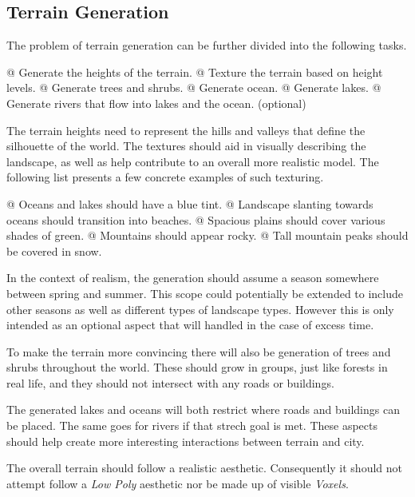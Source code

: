 \subsection{Terrain Generation}

The problem of terrain generation can be further divided into the following tasks.
\begin{easylist}
  @ Generate the heights of the terrain.
  @ Texture the terrain based on height levels.
  @ Generate trees and shrubs.
  @ Generate ocean.
  @ Generate lakes.
  @ Generate rivers that flow into lakes and the ocean. (optional)
\end{easylist}

The terrain heights need to represent the hills and valleys that define the silhouette of the world.
The textures should aid in visually describing the landscape, as well as
help contribute to an overall more realistic model. The following list presents
a few concrete examples of such texturing.
\begin{easylist}
  @ Oceans and lakes should have a blue tint.
  @ Landscape slanting towards oceans should transition into beaches.
  @ Spacious plains should cover various shades of green.
  @ Mountains should appear rocky.
  @ Tall mountain peaks should be covered in snow.
\end{easylist}

In the context of realism, the generation should assume a season somewhere
between spring and summer.
This scope could potentially be extended to include other seasons as well as
different types of landscape types.
However this is only intended as an optional aspect that will handled in the case
of excess time.

To make the terrain more convincing there will also be generation of trees and shrubs
throughout the world. These should grow in groups, just like forests in
real life, and they should not intersect with any roads or buildings.

The generated lakes and oceans will both restrict where roads and buildings can be placed.
The same goes for rivers if that strech goal is met.
These aspects should help create more interesting interactions between terrain and city.

The overall terrain should follow a realistic aesthetic. Consequently it should not
attempt follow a \textit{Low Poly} aesthetic nor be made up of visible \textit{Voxels}.